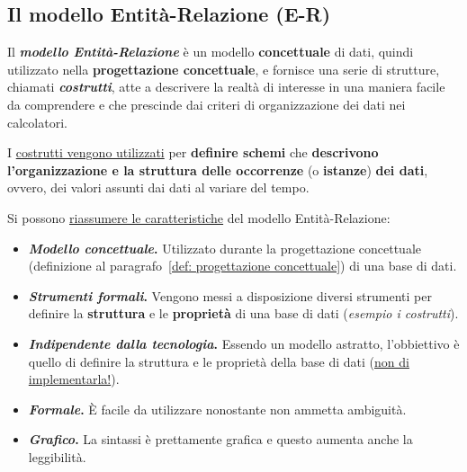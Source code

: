 \documentclass[a4paper]{article}
\begin{document}
	\newpage
	
	
	
	
	\subsection{Il modello Entità-Relazione (E-R)}\label{par: Il modello Entità-Relazione (E-R)}
	
	Il \textcolor{Red3}{\textbf{\emph{modello Entità-Relazione}}} è un modello \textbf{concettuale} di dati, quindi utilizzato nella \textbf{progettazione concettuale}, e fornisce una serie di strutture, chiamati \textbf{\emph{costrutti}}, atte a descrivere la realtà di interesse in una maniera facile da comprendere e che prescinde dai criteri di organizzazione dei dati nei calcolatori.
	
	I \underline{costrutti vengono utilizzati} per \textbf{definire schemi} che \textbf{descrivono l'organizzazione e la struttura delle occorrenze} (o \textbf{istanze}) \textbf{dei dati}, ovvero, dei valori assunti dai dati al variare del tempo.
	
	\noindent
	Si possono \underline{riassumere le caratteristiche} del modello Entità-Relazione:
	
	\begin{itemize}
		\item[\ding{42}] \textcolor{SpringGreen4}{\textbf{\emph{Modello concettuale}.}} Utilizzato durante la progettazione concettuale (definizione al paragrafo~\ref{def: progettazione concettuale}) di una base di dati.
		
		\item[\ding{42}] \textcolor{SpringGreen4}{\textbf{\emph{Strumenti formali}.}} Vengono messi a disposizione diversi strumenti per definire la \textbf{struttura} e le \textbf{proprietà} di una base di dati (\emph{esempio i costrutti}).
		
		\item[\ding{42}] \textcolor{SpringGreen4}{\textbf{\emph{Indipendente dalla tecnologia}.}} Essendo un modello astratto, l'obbiettivo è quello di definire la struttura e le proprietà della base di dati (\underline{non di implementarla!}).
		
		\item[\ding{42}] \textcolor{SpringGreen4}{\textbf{\emph{Formale}.}} È facile da utilizzare nonostante non ammetta ambiguità.
		
		\item[\ding{42}] \textcolor{SpringGreen4}{\textbf{\emph{Grafico}.}} La sintassi è prettamente grafica e questo aumenta anche la leggibilità.
	\end{itemize}
\end{document}
